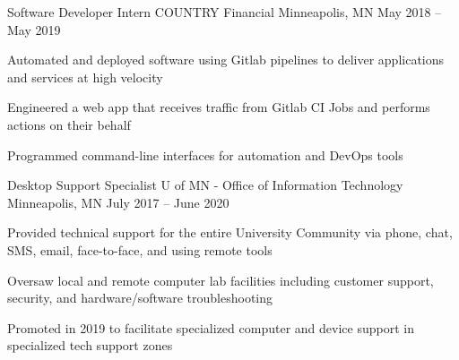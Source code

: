 \documentclass[]{awesome-cv}
\begin{document}
\begin{cventries}
	\cventry
	{Software Developer Intern}
	{COUNTRY Financial}
	{Minneapolis, MN}
	{May 2018 – May 2019}
	{\begin{cvitems}
		\item {Automated and deployed software using Gitlab pipelines to deliver applications and services at high velocity}
		\item {Engineered a web app that receives traffic from Gitlab CI Jobs and performs actions on their behalf}
		\item{Programmed command-line interfaces for automation and DevOps tools}
		\end{cvitems}}
	\cventry
	{Desktop Support Specialist}
	{U of MN - Office of Information Technology}
	{Minneapolis, MN}
	{July 2017 – June 2020}
	{\begin{cvitems}
		\item {Provided technical support for the entire University Community via phone, chat, SMS, email, face-to-­face, and using remote tools}
		\item {Oversaw local and remote computer lab facilities including customer support, security, and hardware/software troubleshooting}
		\item{Promoted in 2019 to facilitate specialized computer and device support in specialized tech support zones}
		\end{cvitems}}
\end{cventries}


\end{document}
